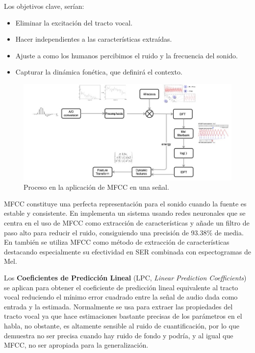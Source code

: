 \documentclass[11pt,a4paper,spanish]{book}
\begin{document}
	Los objetivos clave, serían:
	\begin{itemize}
		\item Eliminar la excitación del tracto vocal.
		\item Hacer independientes a las características extraídas.
		\item Ajuste a como los humanos percibimos el ruido y la frecuencia del sonido.
		\item Capturar la dinámica fonética, que definirá el contexto.
	\end{itemize}
	
	\begin{figure}[H]
		\centering
		\includegraphics[scale=0.25]{MFCC_process.jpeg} 
		\caption{Proceso en la aplicación de MFCC en una señal.}
		\label{fig:mfcc_process}
	\end{figure}
	
	MFCC constituye una perfecta representación para el sonido cuando la fuente es estable y consistente. En \cite{Sarkania2013} implementa un sistema usando redes neuronales que se centra en el uso de MFCC como extracción de características y añade un filtro  de paso alto para reducir el ruido, consiguiendo una precisión de 93.38\% de media. En \cite{Wang2020} también se utiliza MFCC como método de extracción de características destacando especialmente su efectividad en SER combinada con espectogramas de Mel.\hfill \break
	
	
	Los \textbf{Coeficientes de Predicción Lineal} (LPC, \emph{Linear Prediction Coefficients}) se aplican para obtener el coeficiente de predicción lineal equivalente al tracto vocal reduciendo el mínimo error cuadrado entre la señal de audio dada como entrada y la estimada. Normalmente se usa para extraer las propiedades del tracto vocal ya que hace estimaciones bastante precisas de los parámetros en el habla, no obstante, es altamente sensible al ruido de cuantificación, por lo que demuestra no ser precisa cuando hay ruido de fondo y podría, y al igual que MFCC, no ser apropiada para la generalización.\hfill \break
	
\end{document}
